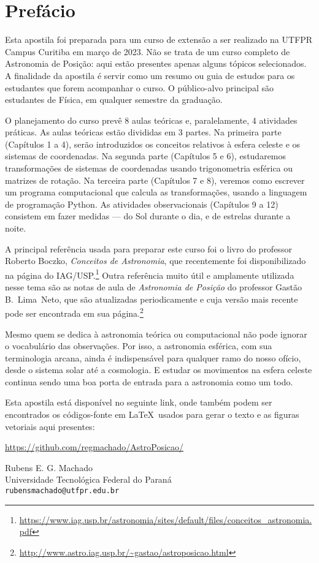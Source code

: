 \chapter*{Prefácio}

Esta apostila foi preparada para um curso de extensão a ser realizado na UTFPR Campus Curitiba em março de 2023. Não se trata de um curso completo de Astronomia de Posição: aqui estão presentes apenas alguns tópicos selecionados. A finalidade da apostila é servir como um resumo ou guia de estudos para os estudantes que forem acompanhar o curso. O público-alvo principal são estudantes de Física, em qualquer semestre da graduação.

O planejamento do curso prevê 8 aulas teóricas e, paralelamente, 4 atividades práticas. As aulas teóricas estão divididas em 3 partes. Na primeira parte (Capítulos 1 a 4), serão introduzidos os conceitos relativos à esfera celeste e os sistemas de coordenadas. Na segunda parte (Capítulos 5 e 6), estudaremos transformações de sistemas de coordenadas usando trigonometria esférica ou matrizes de rotação. Na terceira parte (Capítulos 7 e 8), veremos como escrever um programa computacional que calcula as transformações, usando a linguagem de programação Python. As atividades observacionais (Capítulos 9 a 12) consistem em fazer medidas --- do Sol durante o dia, e de estrelas durante a noite.

A principal referência usada para preparar este curso foi o livro do professor Roberto Boczko, \textit{Conceitos de Astronomia}, que recentemente foi disponibilizado na página do IAG/USP.\footnote{\url{https://www.iag.usp.br/astronomia/sites/default/files/conceitos_astronomia.pdf}} Outra referência muito útil e amplamente utilizada nesse tema são as notas de aula de \textit{Astronomia de Posição} do professor Gastão B.~Lima~Neto, que são atualizadas periodicamente e cuja versão mais recente pode ser encontrada em sua página.\footnote{\url{http://www.astro.iag.usp.br/~gastao/astroposicao.html}}

Mesmo quem se dedica à astronomia teórica ou computacional não pode ignorar o vocabulário das observações. Por isso, a astronomia esférica, com sua terminologia arcana, ainda é indispensável para qualquer ramo do nosso ofício, desde o sistema solar até a cosmologia. E estudar os movimentos na esfera celeste continua sendo uma boa porta de entrada para a astronomia como um todo.

Esta apostila está disponível no seguinte link, onde também podem ser encontrados os códigos-fonte em \LaTeX\ usados para gerar o texto e as figuras vetoriais aqui presentes:

\begin{center}
\url{https://github.com/regmachado/AstroPosicao/}
\end{center}

\begin{flushright}
\noindent Rubens E. G. Machado\\
Universidade Tecnológica Federal do Paraná\\
\texttt{rubensmachado@utfpr.edu.br}
\end{flushright}
